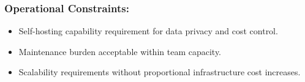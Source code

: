 \subsubsection{Operational Constraints:}
\begin{itemize}
    \item Self-hosting capability requirement for data privacy and cost control.
    \item Maintenance burden acceptable within team capacity.
    \item Scalability requirements without proportional infrastructure cost increases.
\end{itemize}